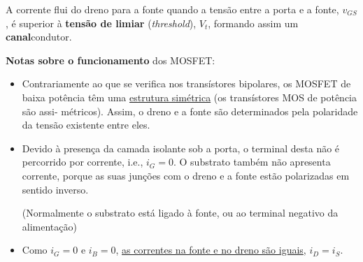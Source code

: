 A corrente flui do dreno para a fonte quando a tensão entre a porta e a fonte, $v_{GS}$, é superior à \textbf{tensão de limiar} (\textit{threshold}), $V_{t}$, formando assim um \textbf{canal}\footnotemark[7] condutor.


\newpage
\noindent \textbf{Notas sobre o funcionamento} dos MOSFET:
\begin{itemize}[leftmargin=*, nolistsep, itemsep=1pt, label=\rule{0.9ex}{0.9ex}]
    \item Contrariamente ao que se verifica nos transístores bipolares, os MOSFET de baixa potência têm uma \underline{estrutura simétrica} (os transístores MOS de potência são assi- métricos). Assim, o dreno e a fonte são determinados pela polaridade da tensão existente entre eles. 

    \item Devido à presença da camada isolante sob a porta, o terminal desta não é percorrido por corrente, i.e., $i_G = 0$. O substrato também não apresenta corrente, porque as suas junções com o dreno e a fonte estão polarizadas em sentido inverso. 
    
    (Normalmente o substrato está ligado à fonte, ou ao terminal negativo da alimentação)

    \item Como $i_G = 0$ e $i_B = 0$, \underline{as correntes na fonte e no dreno são iguais}, $i_D = i_S$.
\end{itemize}

